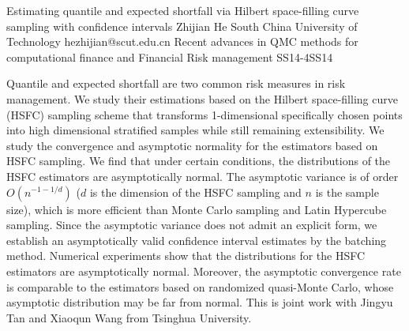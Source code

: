 \begin{talk}
  {Estimating quantile and expected shortfall via Hilbert space-filling curve sampling with confidence intervals}%
  {Zhijian He}%
  {South China University of Technology}%
  {hezhijian@scut.edu.cn}%
  {}%
{Recent advances in QMC methods for computational finance and Financial Risk management}
{}{SS14-4}{SS14}


Quantile and expected shortfall  are two common risk measures in risk management. We study their estimations based on the Hilbert space-filling curve (HSFC) sampling scheme that transforms 1-dimensional specifically chosen points into high dimensional stratified samples while still remaining extensibility. We study the convergence and asymptotic normality for the estimators based on HSFC sampling. We find that under certain conditions, the distributions of the HSFC estimators are asymptotically normal. The asymptotic variance is of order $O(n^{-1-1/d})$ ($d$ is the dimension of the HSFC sampling and $n$ is the sample size), which is more efficient than Monte Carlo sampling and Latin Hypercube sampling. Since the asymptotic variance does not admit an explicit form, we establish an asymptotically valid confidence interval estimates by the batching method.  Numerical experiments show that the distributions for the HSFC estimators are asymptotically normal. Moreover, the asymptotic convergence rate is comparable to the estimators based on randomized quasi-Monte Carlo, whose asymptotic distribution may be far from normal. This is joint work with Jingyu Tan and Xiaoqun Wang from Tsinghua University.
\end{talk}

